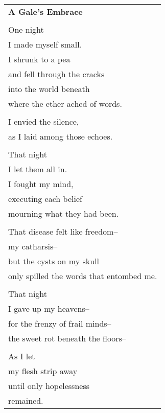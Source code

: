 \documentclass{article}
\begin{document}
\begin{center}
\begin{tabular}{l}
\textbf{A Gale's Embrace} \\
\\
One night \\
I made myself small. \\
I shrunk to a pea \\
and fell through the cracks \\
into the world beneath \\
where the ether ached of words. \\
\\
I envied the silence, \\
as I laid among those echoes. \\
\\
That night \\
I let them all in. \\
I fought my mind, \\
executing each belief \\
mourning what they had been. \\
\\
That disease felt like freedom-- \\
my catharsis-- \\
but the cysts on my skull \\
only spilled the words that entombed me. \\ %
\\
That night \\
I gave up my heavens-- \\
for the frenzy of frail minds-- \\
the sweet rot beneath the floors-- \\
\\
As I let \\
my flesh strip away \\
until only hopelessness \\
remained. \\
\end{tabular}
\end{center}
\end{document}

